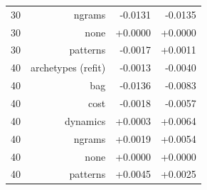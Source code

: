 \begin{tabular}{lrrr}
30 & ngrams & -0.0131 & -0.0135 \\
30 & none & +0.0000 & +0.0000 \\
30 & patterns & -0.0017 & +0.0011 \\
40 & archetypes (refit) & -0.0013 & -0.0040 \\
40 & bag & -0.0136 & -0.0083 \\
40 & cost & -0.0018 & -0.0057 \\
40 & dynamics & +0.0003 & +0.0064 \\
40 & ngrams & +0.0019 & +0.0054 \\
40 & none & +0.0000 & +0.0000 \\
40 & patterns & +0.0045 & +0.0025 \\
\bottomrule
\end{tabular}
